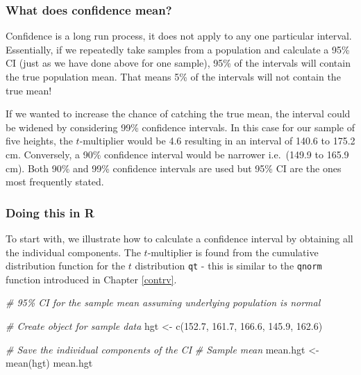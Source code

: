 \documentclass[
  oneside]{krantz}
\newenvironment{Shaded}{\begin{snugshade}}{\end{snugshade}}
\newcommand{\CommentTok}[1]{\textcolor[rgb]{0.56,0.35,0.01}{\textit{#1}}}
\newcommand{\FloatTok}[1]{\textcolor[rgb]{0.00,0.00,0.81}{#1}}
\newcommand{\FunctionTok}[1]{\textcolor[rgb]{0.00,0.00,0.00}{#1}}
\newcommand{\NormalTok}[1]{#1}
\newcommand{\OtherTok}[1]{\textcolor[rgb]{0.56,0.35,0.01}{#1}}
\begin{document}
\hypertarget{what-does-confidence-mean}{%
\subsubsection{What does confidence mean?}\label{what-does-confidence-mean}}

Confidence is a long run process, it does not apply to any one particular interval. Essentially, if we repeatedly take samples from a population and calculate a 95\% CI (just as we have done above for one sample), 95\% of the intervals will contain the true population mean. That means 5\% of the intervals will not contain the true mean!

If we wanted to increase the chance of catching the true mean, the interval could be widened by considering 99\% confidence intervals. In this case for our sample of five heights, the \(t\)-multiplier would be 4.6 resulting in an interval of 140.6 to 175.2 cm. Conversely, a 90\% confidence interval would be narrower i.e.~(149.9 to 165.9 cm). Both 90\% and 99\% confidence intervals are used but 95\% CI are the ones most frequently stated.

\hypertarget{doing-this-in-r-7}{%
\subsubsection{Doing this in R}\label{doing-this-in-r-7}}

To start with, we illustrate how to calculate a confidence interval by obtaining all the individual components. The \(t\)-multiplier is found from the cumulative distribution function for the \(t\) distribution \texttt{qt} - this is similar to the \texttt{qnorm} function introduced in Chapter \ref{contrv}.

\begin{Shaded}
\begin{Highlighting}[]
\CommentTok{\# 95\% CI for the sample mean assuming underlying population is normal}

\CommentTok{\# Create object for sample data}
\NormalTok{hgt }\OtherTok{\textless{}{-}} \FunctionTok{c}\NormalTok{(}\FloatTok{152.7}\NormalTok{, }\FloatTok{161.7}\NormalTok{, }\FloatTok{166.6}\NormalTok{, }\FloatTok{145.9}\NormalTok{, }\FloatTok{162.6}\NormalTok{)}

\CommentTok{\# Save the individual components of the CI}
\CommentTok{\# Sample mean}
\NormalTok{mean.hgt }\OtherTok{\textless{}{-}} \FunctionTok{mean}\NormalTok{(hgt)}
\NormalTok{mean.hgt}
\end{Highlighting}
\end{Shaded}
\end{document}
